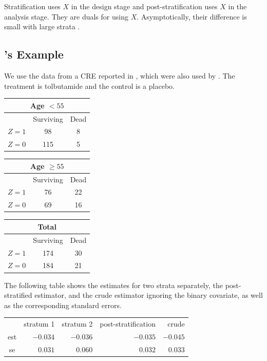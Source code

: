 Stratification uses $X$ in the design stage and post-stratification uses $X$ in the analysis stage.  They are duals for using $X$. 
Asymptotically, their difference is small with large strata \citep{miratrix:2013}.

\subsection{\citet{meinert1970study}'s Example}\label{sec::ps-merinert}

We use the data from a CRE reported in \citet{meinert1970study}, which were also used by \citet{rothman2008modern}. The treatment is tolbutamide and the control is a placebo. 
\begin{center} 
\begin{tabular}{ccc}
\multicolumn{3}{c}{ Age $< 55$} \\
\hline 
 & Surviving & Dead \\
$Z=1$ &    98 & 8 \\
$Z=0$  & 115 & 5 \\
\hline 
\end{tabular}
\begin{tabular}{ccc}
\multicolumn{3}{c}{ Age $\geq  55$} \\
\hline 
 & Surviving & Dead \\
$Z=1$ &    76 & 22 \\
$Z=0$  &  69 & 16 \\
\hline 
\end{tabular}
\begin{tabular}{ccc}
\multicolumn{3}{c}{Total } \\
\hline 
 & Surviving & Dead \\
$Z=1$ &    174 & 30 \\
$Z=0$  & 184 & 21 \\
\hline 
\end{tabular}
\end{center}
 

The following table shows the estimates for two strata separately, the post-stratified estimator, and the crude estimator ignoring the binary covariate, as well as the corresponding standard errors.  
\begin{center}
\begin{tabular}{crrrr}
\hline 
    &stratum 1& stratum 2 &post-stratification &  crude \\
est &    $-0.034$ &   $-0.036$ &  $-0.035$ & $-0.045$ \\
se   &   $0.031$    & $0.060$   & $0.032$   & $0.033$\\
\hline 
\end{tabular}
\end{center} 


